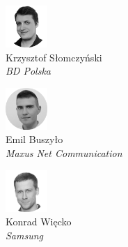 \begin{minipage}[t]{0.33\textwidth}
	\center     
    \includegraphics[width=60px]{img/people/czarno_biale/krzysztof-crop.png}   \\
    Krzysztof Słomczyński \\
    	\textit{BD Polska}
\end{minipage}
\begin{minipage}[t]{0.33\textwidth}
	\center 
    \includegraphics[width=60px]{img/people/czarno_biale/emilb.png}    \\
    Emil Buszyło \\
	\textit{Maxus Net Communication}  
\end{minipage}
\begin{minipage}[t]{0.33\textwidth}
	\center     
    \includegraphics[width=60px]{img/people/czarno_biale/konrad-crop.png}   \\
    Konrad Więcko \\
	\textit{Samsung}
\end{minipage}
